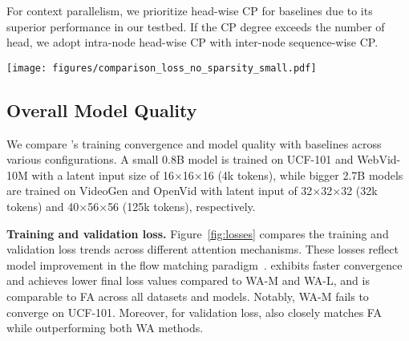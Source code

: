 For context parallelism, we prioritize head-wise CP for baselines due to its superior performance in our testbed. If the CP degree exceeds the number of head, we adopt intra-node head-wise CP with inter-node sequence-wise CP.

\begin{table}[t]
\caption{Model configurations in our evaluation.}
\label{table:model_config}
\vspace{-4mm}
\end{table}


\begin{figure*}[t]
  \centering
  \texttt{[image: figures/comparison\_loss\_no\_sparsity\_small.pdf]} 
\caption{Comparison of training loss and validation loss throughout the training process for different methods across four datasets.}
  \label{fig:losses} 
\end{figure*}



\subsection{Overall Model Quality}
\label{sec:quality}
We compare \sys's training convergence and model quality with baselines across various configurations. 
A small 0.8B model is trained on UCF-101 and WebVid-10M with a latent input size of 16$\times$16$\times$16 (4k tokens), while bigger 2.7B models are trained on VideoGen and OpenVid with latent input of 32$\times$32$\times$32 (32k tokens) and 40$\times$56$\times$56 (125k tokens), respectively. 

\noindent\textbf{Training and validation loss.} Figure~\ref{fig:losses} compares the training and validation loss trends across different attention mechanisms. 
These losses reflect model improvement in the flow matching paradigm~\cite{polyak2024movie}. 
\sys exhibits faster convergence and achieves lower final loss values compared to WA-M and WA-L, and is comparable to FA across all datasets and models. Notably, WA-M fails to converge {on UCF-101}. Moreover, for validation loss, \sys also closely matches FA while outperforming both WA methods.



